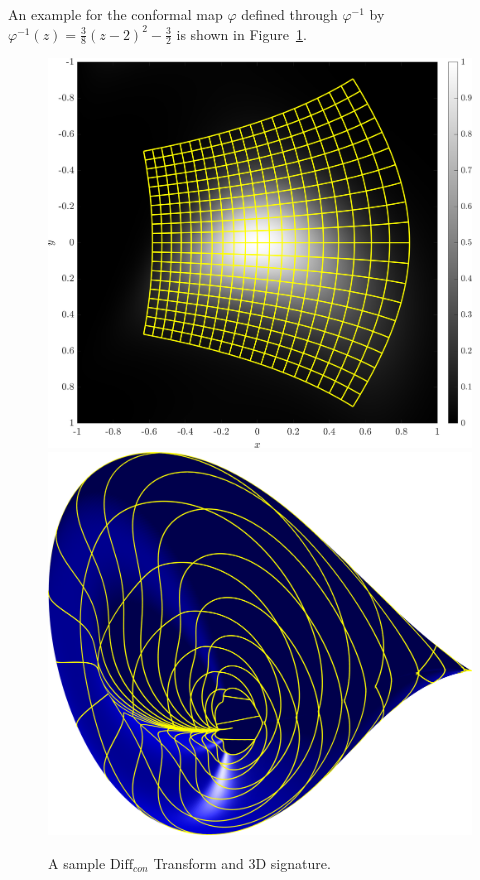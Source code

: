 \documentclass[review,onefignum,onetabnum]{siamonline190516}
\begin{document}
An example for the conformal map $\varphi$ defined through $\varphi^{-1}$ by
$\varphi^{-1}(z) = \frac{3}{8}(z - 2)^2 - \frac{3}{2}$ is shown in
Figure~\ref{fig:Diffcon}.
\begin{figure}
\centering 
\includegraphics[width=.45\textwidth]{Figs/f_transformed_Diffcon.png}
\includegraphics[width=.45\textwidth]{Figs/Diffcon_signature.png}
\caption{A sample $\text{Diff}_{con}$ Transform and 3D signature.}
\label{fig:Diffcon}
\end{figure}



\end{document}
